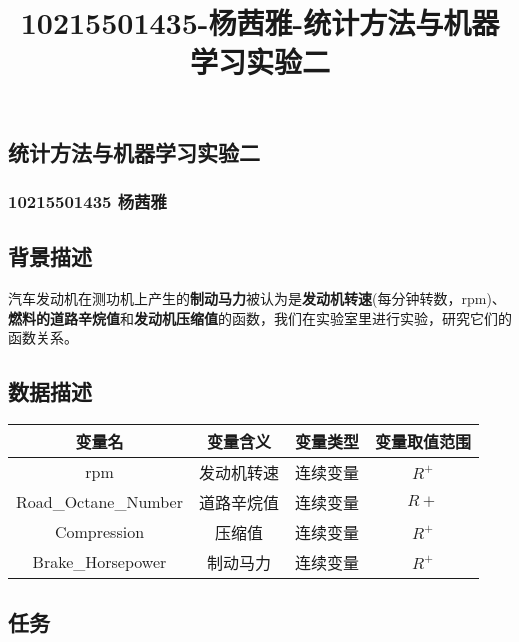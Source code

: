 \documentclass[11pt]{article}
\title{10215501435-杨茜雅-统计方法与机器学习实验二}
\begin{document}
    
    \maketitle
    
    

    
    \hypertarget{ux7edfux8ba1ux65b9ux6cd5ux4e0eux673aux5668ux5b66ux4e60ux5b9eux9a8cux4e8c}{%
\subsection{统计方法与机器学习实验二}\label{ux7edfux8ba1ux65b9ux6cd5ux4e0eux673aux5668ux5b66ux4e60ux5b9eux9a8cux4e8c}}

\hypertarget{ux6768ux831cux96c5}{%
\subsubsection{10215501435 杨茜雅}\label{ux6768ux831cux96c5}}

\hypertarget{ux80ccux666fux63cfux8ff0}{%
\subsection{背景描述}\label{ux80ccux666fux63cfux8ff0}}

汽车发动机在测功机上产生的\textbf{制动马力}被认为是\textbf{发动机转速}(每分钟转数，rpm)、\textbf{燃料的道路辛烷值}和\textbf{发动机压缩值}的函数，我们在实验室里进行实验，研究它们的函数关系。

\hypertarget{ux6570ux636eux63cfux8ff0}{%
\subsection{数据描述}\label{ux6570ux636eux63cfux8ff0}}

\begin{longtable}[]{@{}cccc@{}}
\toprule\noalign{}
变量名 & 变量含义 & 变量类型 & 变量取值范围 \\
\midrule\noalign{}
\endhead
\bottomrule\noalign{}
\endlastfoot
rpm & 发动机转速 & 连续变量 & \(R^+\) \\
Road\_Octane\_Number & 道路辛烷值 & 连续变量 & \(R+\) \\
Compression & 压缩值 & 连续变量 & \(R^+\) \\
Brake\_Horsepower & 制动马力 & 连续变量 & \(R^+\) \\
\end{longtable}

\hypertarget{ux4efbux52a1}{%
\subsection{任务}\label{ux4efbux52a1}}
\end{document}

